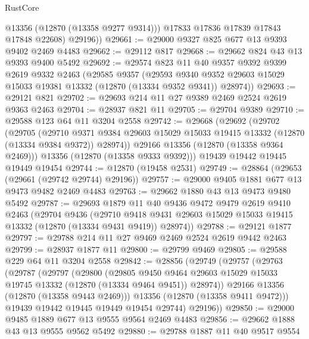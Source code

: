 \begin{lexlean}{RustCore}
\begin{coremodule}
            @13356
            (@12870 (@13358 @9277 @9314)))
          @17833
          @17836
          @17839
          @17843
          @17848
          @22608)
        @29196))
@29661 := @29000 @9327 @825 @677 @13 @9393 @9402 @2469 @4483
@29662 := @29112 @817
@29668 := @29662 @824 @43 @13 @9393 @9400 @5492
@29692 := @29574
    @823
    @11
    @40
    @9357
    @9392
    @9399
    @2619
    @9332
    @2463
    (@29585
      @9357
      (@29593 @9340 @9352 @29603 @15029 @15033 @19381 @13332 (@12870 (@13334 @9352 @9341)) @28974))
@29693 := @29121 @821
@29702 := @29693 @214 @11 @27 @9389 @2469 @2524 @2619 @9363 @2463
@29704 := @28937 @821 @11
@29705 := @29704 @9389
@29710 := @29588 @123 @64 @11 @3204 @2558
@29742 := @29668
    (@29692
      (@29702
        (@29705
          (@29710
            @9371
            @9384
            @29603
            @15029
            @15033
            @19415
            @13332
            (@12870 (@13334 @9384 @9372))
            @28974))
        @29166
        @13356
        (@12870 (@13358 @9364 @2469)))
      @13356
      (@12870 (@13358 @9333 @9392)))
    @19439
    @19442
    @19445
    @19449
    @19454
@29744 := @12870 (@19458 @2531)
@29749 := @28864 (@29653 (@29661 (@29742 @29744) @29196))
@29757 := @29000 @9405 @1881 @677 @13 @9473 @9482 @2469 @4483
@29763 := @29662 @1880 @43 @13 @9473 @9480 @5492
@29787 := @29693
    @1879
    @11
    @40
    @9436
    @9472
    @9479
    @2619
    @9410
    @2463
    (@29704
      @9436
      (@29710 @9418 @9431 @29603 @15029 @15033 @19415 @13332 (@12870 (@13334 @9431 @9419)) @28974))
@29788 := @29121 @1877
@29797 := @29788 @214 @11 @27 @9469 @2469 @2524 @2619 @9442 @2463
@29799 := @28937 @1877 @11
@29800 := @29799 @9469
@29805 := @29588 @229 @64 @11 @3204 @2558
@29842 := @28856
    (@29749
      (@29757
        (@29763
          (@29787
            (@29797
              (@29800
                (@29805
                  @9450
                  @9464
                  @29603
                  @15029
                  @15033
                  @19745
                  @13332
                  (@12870 (@13334 @9464 @9451))
                  @28974))
              @29166
              @13356
              (@12870 (@13358 @9443 @2469)))
            @13356
            (@12870 (@13358 @9411 @9472)))
          @19439
          @19442
          @19445
          @19449
          @19454
          @29744)
        @29196))
@29850 := @29000 @9485 @1889 @677 @13 @9555 @9564 @2469 @4483
@29856 := @29662 @1888 @43 @13 @9555 @9562 @5492
@29880 := @29788
    @1887
    @11
    @40
    @9517
    @9554

\end{coremodule}
\end{lexlean}
